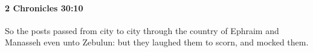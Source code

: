 
		\paragraph{2 Chronicles 30:10} %
			\label{2CHRONICLES-30-10}

			So the posts passed from city to city through the country of Ephraim and Manasseh even unto Zebulun: but they laughed them to scorn, and mocked them.


